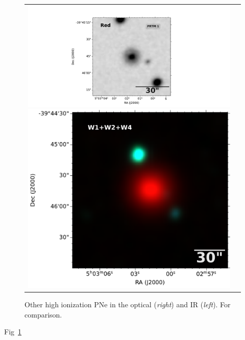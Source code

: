 \documentclass[twocolumn]{article}
\begin{document}
\begin{figure}
\begin{tabular}{l l}
\includegraphics[width=0.52\linewidth, trim=280 10 350 10, clip]{../known-pn/PNPRTM1/dss_search_red.pdf}
\includegraphics[width=0.5\linewidth, trim=8 5 5 5, clip]{../known-pn/PNPRTM1/0754m394_ac51-w4-int-3_ra75.75721626934_dec-39.76236833917_asec150.000-421-RGB.pdf}\\

\end{tabular}  
  \caption{Other high ionization PNe in the optical (\textit{right}) and IR (\textit{left}). For comparison. } 
  \label{fig:images-known}
\end{figure}

Fig~\ref{fig:images-known}


\end{document}
